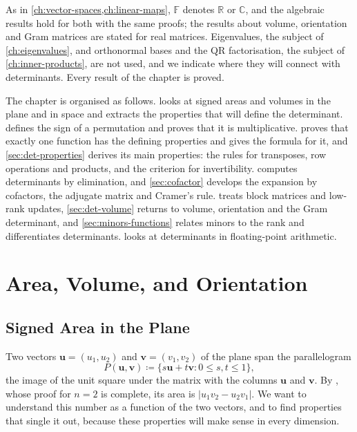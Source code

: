 As in \cref{ch:vector-spaces,ch:linear-maps}, $\mathbb F$ denotes $\mathbb R$ or $\mathbb C$, and the algebraic results hold for both with the same proofs; the results about volume, orientation and Gram matrices are stated for real matrices. Eigenvalues, the subject of \cref{ch:eigenvalues}, and orthonormal bases and the QR factorisation, the subject of \cref{ch:inner-products}, are not used, and we indicate where they will connect with determinants. Every result of the chapter is proved.

The chapter is organised as follows.  looks at signed areas and volumes in the plane and in space and extracts the properties that will define the determinant.  defines the sign of a permutation and proves that it is multiplicative.  proves that exactly one function has the defining properties and gives the formula for it, and \cref{sec:det-properties} derives its main properties: the rules for transposes, row operations and products, and the criterion for invertibility.  computes determinants by elimination, and \cref{sec:cofactor} develops the expansion by cofactors, the adjugate matrix and Cramer's rule.  treats block matrices and low-rank updates, \cref{sec:det-volume} returns to volume, orientation and the Gram determinant, and \cref{sec:minors-functions} relates minors to the rank and differentiates determinants.  looks at determinants in floating-point arithmetic.

\section{Area, Volume, and Orientation}
\label{sec:det-geometry}

\subsection{Signed Area in the Plane}

Two vectors $\mathbf u=(u_1,u_2)$ and $\mathbf v=(v_1,v_2)$ of the plane span the parallelogram
\[
P(\mathbf u,\mathbf v)\coloneqq\{s\mathbf u+t\mathbf v: 0\le s,t\le1\},
\]
the image of the unit square under the matrix with the columns $\mathbf u$ and $\mathbf v$. By , whose proof for $n=2$ is complete, its area is $|u_1v_2-u_2v_1|$. We want to understand this number as a function of the two vectors, and to find properties that single it out, because these properties will make sense in every dimension.

